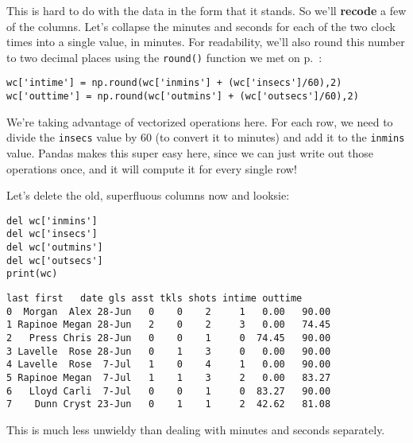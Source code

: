 
This is hard to do with the data in the form that it stands. So we'll
\textbf{recode} a few of the columns. Let's collapse the minutes and seconds
for each of the two clock times into a single value, in minutes. For
readability, we'll also round this number to two decimal places using the
\texttt{round()} function we met on p.~\pageref{round}:

\begin{Verbatim}[fontsize=\footnotesize,samepage=true,frame=single,framesep=3mm]
wc['intime'] = np.round(wc['inmins'] + (wc['insecs']/60),2)
wc['outtime'] = np.round(wc['outmins'] + (wc['outsecs']/60),2)
\end{Verbatim}


We're taking advantage of vectorized operations here. For each row, we need to
divide the \texttt{insecs} value by 60 (to convert it to minutes) and add it
to the \texttt{inmins} value. Pandas makes this super easy here, since we can
just write out those operations once, and it will compute it for every single
row!

\medskip
Let's delete the old, superfluous columns now and looksie:

\begin{Verbatim}[fontsize=\footnotesize,samepage=true,frame=single,framesep=3mm]
del wc['inmins']
del wc['insecs']
del wc['outmins']
del wc['outsecs']
print(wc)
\end{Verbatim}
\vspace{-.2in}

\begin{Verbatim}[fontsize=\footnotesize,samepage=true,frame=leftline,framesep=5mm,framerule=1mm]
     last first   date gls asst tkls shots intime outtime
0  Morgan  Alex 28-Jun   0    0    2     1   0.00   90.00
1 Rapinoe Megan 28-Jun   2    0    2     3   0.00   74.45
2   Press Chris 28-Jun   0    0    1     0  74.45   90.00
3 Lavelle  Rose 28-Jun   0    1    3     0   0.00   90.00
4 Lavelle  Rose  7-Jul   1    0    4     1   0.00   90.00
5 Rapinoe Megan  7-Jul   1    1    3     2   0.00   83.27
6   Lloyd Carli  7-Jul   0    0    1     0  83.27   90.00
7    Dunn Cryst 23-Jun   0    1    1     2  42.62   81.08
\end{Verbatim}

This is much less unwieldy than dealing with minutes and seconds separately.

